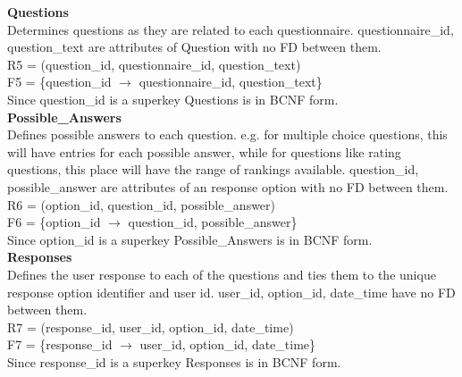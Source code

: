 \documentclass[12pt, oneside]{article}
\newcommand{\tb}[1]{\textbf{#1}}
\begin{document}
    \tb{Questions} \\
    Determines questions as they are related to each questionnaire. questionnaire\_id, question\_text are attributes of Question with no FD between them. \\
    R5 = (question\_id, questionnaire\_id, question\_text) \\
    F5 = \{question\_id \(\rightarrow\) questionnaire\_id, question\_text\} \\
    Since question\_id is a superkey Questions is in BCNF form. 
    \\

    \tb{Possible\_Answers} \\
    Defines possible answers to each question. e.g. for multiple choice questions, this will have entries for each possible answer, while for questions like rating questions, this place will have the range of rankings available. question\_id, possible\_answer are attributes of an response option with no FD between them. \\
    R6 = (option\_id, question\_id, possible\_answer) \\
    F6 = \{option\_id \(\rightarrow\) question\_id, possible\_answer\} \\
    Since option\_id is a superkey Possible\_Answers is in BCNF form. 
    \\

    \tb{Responses} \\
    Defines the user response to each of the questions and ties them to the unique response option identifier and user id. user\_id, option\_id, date\_time have no FD between them. \\
    R7 = (response\_id, user\_id, option\_id, date\_time) \\
    F7 = \{response\_id $\rightarrow$ user\_id, option\_id, date\_time\} \\
    Since response\_id is a superkey Responses is in BCNF form. 
    \\
\end{document}

